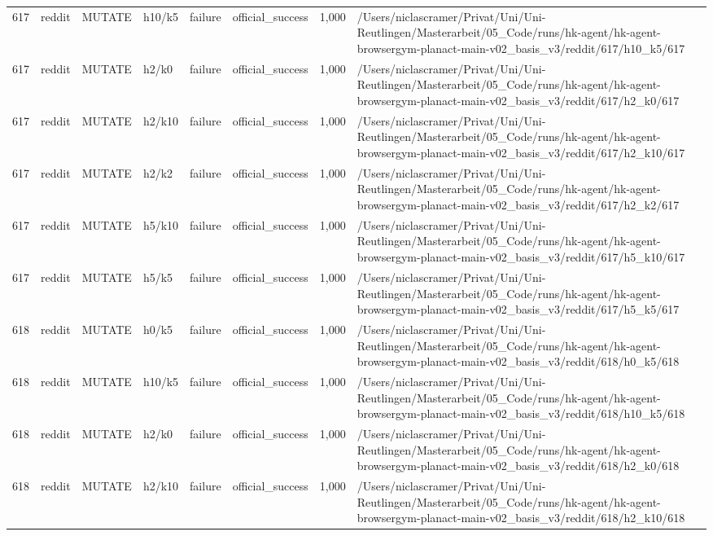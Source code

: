 \begin{longtable}{rlllllrl}
617 & reddit & MUTATE & h10/k5 & failure & official\_success & 1,000 & /Users/niclascramer/Privat/Uni/Uni-Reutlingen/Masterarbeit/05\_Code/runs/hk-agent/hk-agent-browsergym-planact-main-v02\_basis\_v3/reddit/617/h10\_k5/617 \\
617 & reddit & MUTATE & h2/k0 & failure & official\_success & 1,000 & /Users/niclascramer/Privat/Uni/Uni-Reutlingen/Masterarbeit/05\_Code/runs/hk-agent/hk-agent-browsergym-planact-main-v02\_basis\_v3/reddit/617/h2\_k0/617 \\
617 & reddit & MUTATE & h2/k10 & failure & official\_success & 1,000 & /Users/niclascramer/Privat/Uni/Uni-Reutlingen/Masterarbeit/05\_Code/runs/hk-agent/hk-agent-browsergym-planact-main-v02\_basis\_v3/reddit/617/h2\_k10/617 \\
617 & reddit & MUTATE & h2/k2 & failure & official\_success & 1,000 & /Users/niclascramer/Privat/Uni/Uni-Reutlingen/Masterarbeit/05\_Code/runs/hk-agent/hk-agent-browsergym-planact-main-v02\_basis\_v3/reddit/617/h2\_k2/617 \\
617 & reddit & MUTATE & h5/k10 & failure & official\_success & 1,000 & /Users/niclascramer/Privat/Uni/Uni-Reutlingen/Masterarbeit/05\_Code/runs/hk-agent/hk-agent-browsergym-planact-main-v02\_basis\_v3/reddit/617/h5\_k10/617 \\
617 & reddit & MUTATE & h5/k5 & failure & official\_success & 1,000 & /Users/niclascramer/Privat/Uni/Uni-Reutlingen/Masterarbeit/05\_Code/runs/hk-agent/hk-agent-browsergym-planact-main-v02\_basis\_v3/reddit/617/h5\_k5/617 \\
618 & reddit & MUTATE & h0/k5 & failure & official\_success & 1,000 & /Users/niclascramer/Privat/Uni/Uni-Reutlingen/Masterarbeit/05\_Code/runs/hk-agent/hk-agent-browsergym-planact-main-v02\_basis\_v3/reddit/618/h0\_k5/618 \\
618 & reddit & MUTATE & h10/k5 & failure & official\_success & 1,000 & /Users/niclascramer/Privat/Uni/Uni-Reutlingen/Masterarbeit/05\_Code/runs/hk-agent/hk-agent-browsergym-planact-main-v02\_basis\_v3/reddit/618/h10\_k5/618 \\
618 & reddit & MUTATE & h2/k0 & failure & official\_success & 1,000 & /Users/niclascramer/Privat/Uni/Uni-Reutlingen/Masterarbeit/05\_Code/runs/hk-agent/hk-agent-browsergym-planact-main-v02\_basis\_v3/reddit/618/h2\_k0/618 \\
618 & reddit & MUTATE & h2/k10 & failure & official\_success & 1,000 & /Users/niclascramer/Privat/Uni/Uni-Reutlingen/Masterarbeit/05\_Code/runs/hk-agent/hk-agent-browsergym-planact-main-v02\_basis\_v3/reddit/618/h2\_k10/618 \\

\end{longtable}
